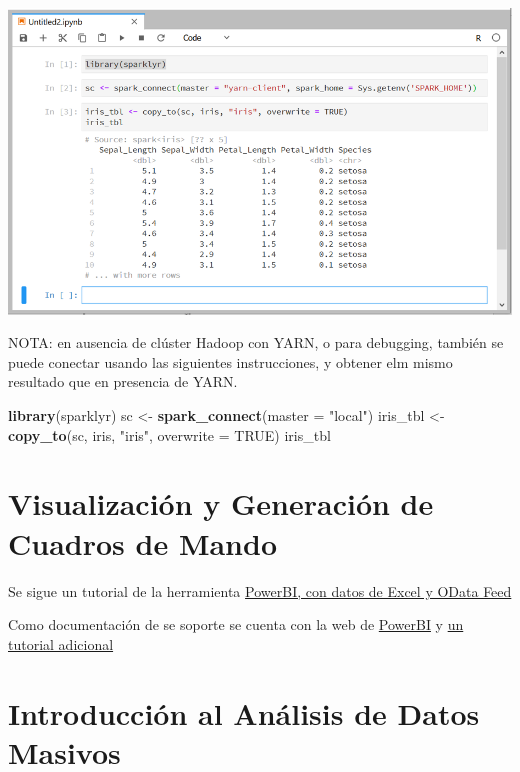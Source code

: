 \documentclass[]{book}
\newenvironment{Shaded}{\begin{snugshade}}{\end{snugshade}}
\newcommand{\DataTypeTok}[1]{\textcolor[rgb]{0.13,0.29,0.53}{#1}}
\newcommand{\KeywordTok}[1]{\textcolor[rgb]{0.13,0.29,0.53}{\textbf{#1}}}
\newcommand{\NormalTok}[1]{#1}
\newcommand{\OtherTok}[1]{\textcolor[rgb]{0.56,0.35,0.01}{#1}}
\newcommand{\StringTok}[1]{\textcolor[rgb]{0.31,0.60,0.02}{#1}}
\begin{document}
\includegraphics{images/T3-sparklyr3.png}

NOTA: en ausencia de clúster Hadoop con YARN, o para debugging, también se puede conectar usando las siguientes instrucciones, y obtener elm mismo resultado que en presencia de YARN.

\begin{Shaded}
\begin{Highlighting}[]
\KeywordTok{library}\NormalTok{(sparklyr)}
\NormalTok{sc <-}\StringTok{ }\KeywordTok{spark_connect}\NormalTok{(}\DataTypeTok{master =} \StringTok{"local"}\NormalTok{)}
\NormalTok{iris_tbl <-}\StringTok{ }\KeywordTok{copy_to}\NormalTok{(sc, iris, }\StringTok{"iris"}\NormalTok{, }\DataTypeTok{overwrite =} \OtherTok{TRUE}\NormalTok{)}
\NormalTok{iris_tbl}
\end{Highlighting}
\end{Shaded}

\hypertarget{visualizacion-y-generacion-de-cuadros-de-mando}{%
\section{Visualización y Generación de Cuadros de Mando}\label{visualizacion-y-generacion-de-cuadros-de-mando}}

Se sigue un tutorial de la herramienta \href{https://docs.microsoft.com/es-es/power-bi/desktop-tutorial-analyzing-sales-data-from-excel-and-an-odata-feed}{PowerBI, con datos de Excel y OData Feed}

Como documentación de se soporte se cuenta con la web de \href{https://docs.microsoft.com/es-es/power-bi/}{PowerBI} y \href{https://ccance.net/manuales/powerbi/capitulo_01_introduccion.pdf}{un tutorial adicional}

\hypertarget{introduccion-al-analisis-de-datos-masivos}{%
\section{Introducción al Análisis de Datos Masivos}\label{introduccion-al-analisis-de-datos-masivos}}
\end{document}
